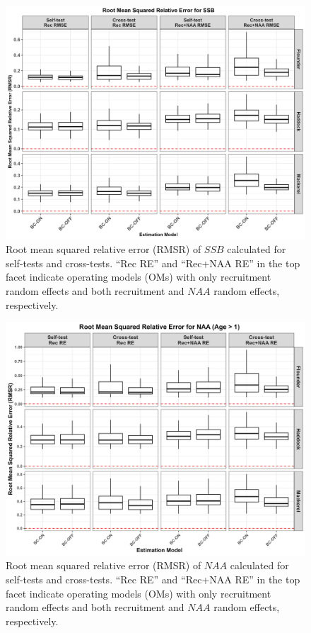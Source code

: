 \documentclass[
  12pt,
]{article}
\begin{document}
\begin{figure}[H]
    \centering
    \includegraphics[width=\textwidth]{Revised_Figures&Tables/RMSR_SSB.PNG}
    \caption{Root mean squared relative error (RMSR) of $SSB$ calculated for self-tests and cross-tests. ``Rec RE'' and ``Rec+NAA RE'' in the top facet indicate operating models (OMs) with only recruitment random effects and both recruitment and $NAA$ random effects, respectively.}
    \label{fig:supp_SSB_RMSR}
\end{figure}

\begin{figure}[H]
    \centering
    \includegraphics[width=\textwidth]{Revised_Figures&Tables/RMSR_NAA.PNG}
    \caption{Root mean squared relative error (RMSR) of $NAA$ calculated for self-tests and cross-tests. ``Rec RE'' and ``Rec+NAA RE'' in the top facet indicate operating models (OMs) with only recruitment random effects and both recruitment and $NAA$ random effects, respectively.}
    \label{fig:supp_NAA_RMSR}
\end{figure}
\end{document}

